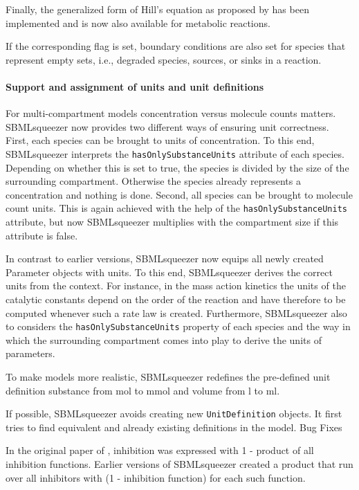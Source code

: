 Finally, the generalized form of Hill's equation as proposed by \citet[in
``Fundamentals of Enzyme Kinetics'', p. 314]{Cornish-Bowden2004} has been
implemented and is now also available for metabolic reactions.

If the corresponding flag is set, boundary conditions are also set for species
that represent empty sets, i.e., degraded species, sources, or sinks in a
reaction.


\paragraph{Support and assignment of units and unit definitions}

For multi-compartment models concentration versus molecule counts matters.
SBMLsqueezer now provides two different ways of ensuring unit correctness.
First, each species can be brought to units of concentration. To this end,
SBMLsqueezer interprets the \texttt{hasOnlySubstanceUnits} attribute of each species.
Depending on whether this is set to true, the species is divided by the size of
the surrounding compartment. Otherwise the species already represents a
concentration and nothing is done. Second, all species can be brought to
molecule count units. This is again achieved with the help of the
\texttt{hasOnlySubstanceUnits} attribute, but now SBMLsqueezer multiplies with the
compartment size if this attribute is false.

In contrast to earlier versions, SBMLsqueezer now equips all newly created
Parameter objects with units. To this end, SBMLsqueezer derives the correct
units from the context. For instance, in the mass action kinetics the units of
the catalytic constants depend on the order of the reaction and have therefore
to be computed whenever such a rate law is created. Furthermore, SBMLsqueezer
also to considers the \texttt{hasOnlySubstanceUnits} property of each species and the way
in which the surrounding compartment comes into play to derive the units of
parameters.

To make models more realistic, SBMLsqueezer redefines the pre-defined \SBML unit
definition substance from mol to mmol and volume from l to ml.

If possible, SBMLsqueezer avoids creating new \texttt{UnitDefinition} objects. It first
tries to find equivalent and already existing definitions in the model.
Bug Fixes

In the original paper of \citet{Hinze2007}, inhibition was expressed with 1 -
product of all inhibition functions. Earlier versions of SBMLsqueezer created a
product that run over all inhibitors with (1 - inhibition function) for each
such function.

